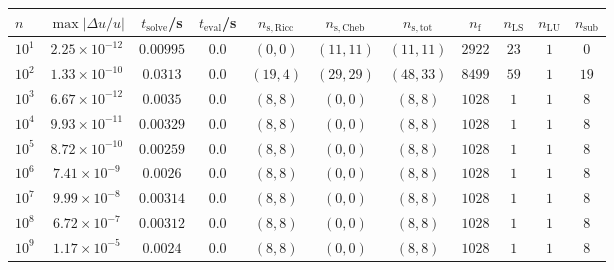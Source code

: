 \begin{tabular}{l c c c c c c c c c c}
\hline \hline 
$n$  &  $\max|\Delta u/u|$  &  $t_{\mathrm{solve}}$/\si{\s}  &  $t_{\mathrm{eval}}$/\si{\s}  &  $n_{\mathrm{s,Ricc}}$  &  $n_{\mathrm{s,Cheb}}$  &  $n_{\mathrm{s,tot}}$  &  $n_{\mathrm{f}}$  &  $n_{\mathrm{LS}}$  &  $n_{\mathrm{LU}}$  &  $n_{\mathrm{sub}}$ \\ \hline
$10^1$  &  $2.25 \times 10^{-12}$  &  $0.00995$  &  $0.0$  &  $(0, 0)$  &  $(11, 11)$  &  $(11, 11)$  &  $2922$  &  $23$  &  $1$  &  $0$\\ 
$10^2$  &  $1.33 \times 10^{-10}$  &  $0.0313$  &  $0.0$  &  $(19, 4)$  &  $(29, 29)$  &  $(48, 33)$  &  $8499$  &  $59$  &  $1$  &  $19$\\ 
$10^3$  &  $6.67 \times 10^{-12}$  &  $0.0035$  &  $0.0$  &  $(8, 8)$  &  $(0, 0)$  &  $(8, 8)$  &  $1028$  &  $1$  &  $1$  &  $8$\\ 
$10^4$  &  $9.93 \times 10^{-11}$  &  $0.00329$  &  $0.0$  &  $(8, 8)$  &  $(0, 0)$  &  $(8, 8)$  &  $1028$  &  $1$  &  $1$  &  $8$\\ 
$10^5$  &  $8.72 \times 10^{-10}$  &  $0.00259$  &  $0.0$  &  $(8, 8)$  &  $(0, 0)$  &  $(8, 8)$  &  $1028$  &  $1$  &  $1$  &  $8$\\ 
$10^6$  &  $7.41 \times 10^{-9}$  &  $0.0026$  &  $0.0$  &  $(8, 8)$  &  $(0, 0)$  &  $(8, 8)$  &  $1028$  &  $1$  &  $1$  &  $8$\\ 
$10^7$  &  $9.99 \times 10^{-8}$  &  $0.00314$  &  $0.0$  &  $(8, 8)$  &  $(0, 0)$  &  $(8, 8)$  &  $1028$  &  $1$  &  $1$  &  $8$\\ 
$10^8$  &  $6.72 \times 10^{-7}$  &  $0.00312$  &  $0.0$  &  $(8, 8)$  &  $(0, 0)$  &  $(8, 8)$  &  $1028$  &  $1$  &  $1$  &  $8$\\ 
$10^9$  &  $1.17 \times 10^{-5}$  &  $0.0024$  &  $0.0$  &  $(8, 8)$  &  $(0, 0)$  &  $(8, 8)$  &  $1028$  &  $1$  &  $1$  &  $8$\\ 
\hline \hline
\end{tabular}
